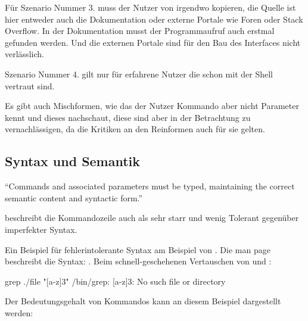 \documentclass[oneside,bibliography=totocnumbered,BCOR=5mm]{scrbook}
\newenvironment{code}{\captionsetup{type=listing, skip=0pt}}{}
\begin{document}
\medskip

Für Szenario Nummer 3. muss der Nutzer von irgendwo kopieren, die Quelle ist
hier entweder auch die Dokumentation oder externe Portale wie Foren oder
Stack Overflow. In der Dokumentation musst der Programmaufruf auch erstmal
gefunden werden. Und die externen Portale sind für den Bau des Interfaces nicht
verlässlich.

\medskip

Szenario Nummer 4. gilt nur für erfahrene Nutzer die schon mit der Shell
vertraut sind.

\medskip

Es gibt auch Mischformen, wie das der Nutzer Kommando aber nicht Parameter kennt
und dieses nachschaut, diese sind aber in der Betrachtung zu vernachlässigen, da
die Kritiken an den Reinformen auch für sie gelten.

\subsection{Syntax und Semantik}

``Commands and associated parameters must be typed, maintaining the correct
semantic content and syntactic form.'' \parencite[184]{Westerman_1997}

\cite{Gentner_1996} beschreibt die Kommandozeile auch als sehr starr und wenig
Tolerant gegenüber imperfekter Syntax.


\bigskip

Ein Beispiel für fehlerintolerante Syntax am Beispiel von .
Die man page beschreibt die Syntax: .
Beim schnell-geschehenen Vertauschen von  und :

\begin{code}
  \begin{shellcode}
grep ./file "[a-z]{3}"
/bin/grep: [a-z]{3}: No such file or directory
  \end{shellcode}
  \medskip
\end{code}

Der Bedeutungsgehalt von Kommandos kann an diesem Beispiel dargestellt werden:
\end{document}
